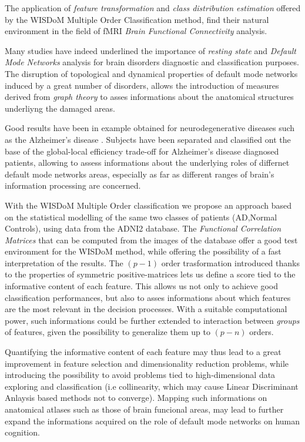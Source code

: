 \documentclass[12pt,openright,twoside,a4paper]{book}
\begin{document}
The application of \textit{feature transformation} and \textit{class distribution estimation} offered by the WISDoM Multiple Order Classification method, find their natural environment in the field of fMRI \textit{Brain Functional Connectivity} analysis.

Many studies have indeed underlined the importance of \textit{resting state} and \textit{Default Mode Networks} analysis for brain disorders diagnostic and classification purposes.
The disruption of topological and dynamical properties of default mode networks induced by a great number of disorders, allows the introduction of measures derived from \textit{graph theory} to asses informations about the anatomical structures underliyng the damaged areas.

Good results have been in example obtained for neurodegenerative diseases such as the Alzheimer's disease \cite{ssa}.
Subjects have been separated and classified ont the base of the global-local efficiency trade-off for Alzheimer's disease diagnosed patients, allowing to assess informations about the underlying roles of differnet default mode networks areas, especially as far as different ranges of brain's information processing are concerned.

With the WISDoM Multiple Order classification  we propose an approach based on the statistical modelling of the same two classes of patients (AD,Normal Controls), using data from the ADNI2 database. 
The \textit{Functional Correlation Matrices} that can be computed from the images of the database offer a good test environment for the WISDoM method, while offering the possibility of a fast interpretation of the results. 
The $(p-1)$ order trasformation introduced thanks to the properties of symmetric positive-matrices lets us define a score tied to the informative content of each feature.
This allows us not only to achieve good classification performances, but also to asses informations about which features are the most relevant in the decision processes.
With a suitable computational power, such informations could be further extended to interaction between \textit{groups} of features, given the possibility to generalize them up to $(p-n)$ orders.

Quantifying the informative content of each feature may thus lead to a great improvement in feature selection and dimensionality reduction problems, while introducing the possibility to avoid problems tied to high-dimensional data exploring and classification (i.e collinearity, which may cause Linear Discriminant Anlaysis based methods not to converge).
Mapping such informations on anatomical atlases  such as those of brain funcional areas, may lead to further expand the informations acquired on the role of default mode networks on human cognition.
\end{document}
